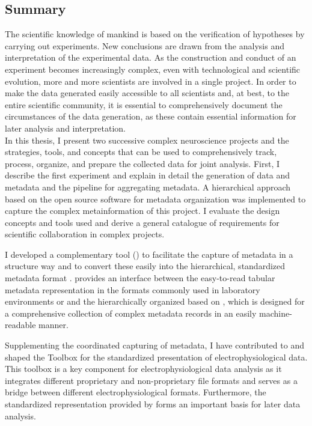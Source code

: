 \clearpage
\thispagestyle{empty}
\subsection*{Summary}
\label{sec:summary}
The scientific knowledge of mankind is based on the verification of hypotheses by carrying out experiments. New conclusions are drawn from the analysis and interpretation of the experimental data. As the construction and conduct of an experiment becomes increasingly complex, even with technological and scientific evolution, more and more scientists are involved in a single project. In order to make the data generated easily accessible to all scientists and, at best, to the entire scientific community, it is essential to comprehensively document the circumstances of the data generation, as these contain essential information for later analysis and interpretation.\\

In this thesis, I present two successive complex neuroscience projects and the strategies, tools, and concepts that can be used to comprehensively track, process, organize, and prepare the collected data for joint analysis. First, I describe the first experiment and explain in detail the generation of data and metadata and the pipeline for aggregating metadata. A hierarchical approach based on the open source software  for metadata organization was implemented to capture the complex metainformation of this project. I evaluate the design concepts and tools used and derive a general catalogue of requirements for scientific collaboration in complex projects.

I developed a complementary tool () to facilitate the capture of metadata in a structure way and to convert these easily into the hierarchical, standardized metadata format .  provides an interface between the easy-to-read tabular metadata representation in the formats commonly used in laboratory environments  or  and the hierarchically organized  based on , which is designed for a comprehensive collection of complex metadata records in an easily machine-readable manner.

Supplementing the coordinated capturing of metadata, I have contributed to and shaped the  Toolbox for the standardized presentation of electrophysiological data. This toolbox is a key component for electrophysiological data analysis as it integrates different proprietary and non-proprietary file formats and serves as a bridge between different electrophysiological formats. Furthermore, the standardized representation provided by  forms an important basis for later data analysis.

